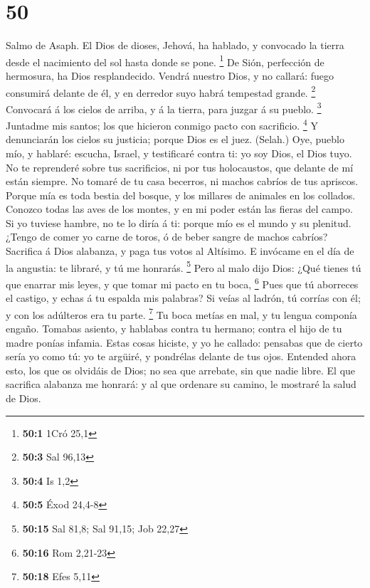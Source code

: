 \hypertarget{section-49}{%
\section{50}\label{section-49}}

 Salmo de Asaph. El Dios de dioses, Jehová, ha hablado, y
convocado la tierra desde el nacimiento del sol hasta donde se pone.
\footnote{\textbf{50:1} 1Cró 25,1}  De Sión, perfección de
hermosura, ha Dios resplandecido.  Vendrá nuestro Dios, y no
callará: fuego consumirá delante de él, y en derredor suyo habrá
tempestad grande. \footnote{\textbf{50:3} Sal 96,13} 
Convocará á los cielos de arriba, y á la tierra, para juzgar á su
pueblo. \footnote{\textbf{50:4} Is 1,2}  Juntadme mis
santos; los que hicieron conmigo pacto con sacrificio. \footnote{\textbf{50:5}
  Éxod 24,4-8}  Y denunciarán los cielos su justicia; porque
Dios es el juez. (Selah.)  Oye, pueblo mío, y hablaré:
escucha, Israel, y testificaré contra ti: yo soy Dios, el Dios tuyo.
 No te reprenderé sobre tus sacrificios, ni por tus
holocaustos, que delante de mí están siempre.  No tomaré de
tu casa becerros, ni machos cabríos de tus apriscos. 
Porque mía es toda bestia del bosque, y los millares de animales en los
collados.  Conozco todas las aves de los montes, y en mi
poder están las fieras del campo.  Si yo tuviese hambre, no
te lo diría á ti: porque mío es el mundo y su plenitud. 
¿Tengo de comer yo carne de toros, ó de beber sangre de machos cabríos?
 Sacrifica á Dios alabanza, y paga tus votos al Altísimo.
 E invócame en el día de la angustia: te libraré, y tú me
honrarás. \footnote{\textbf{50:15} Sal 81,8; Sal 91,15; Job 22,27}
 Pero al malo dijo Dios: ¿Qué tienes tú que enarrar mis
leyes, y que tomar mi pacto en tu boca, \footnote{\textbf{50:16} Rom
  2,21-23}  Pues que tú aborreces el castigo, y echas á tu
espalda mis palabras?  Si veías al ladrón, tú corrías con
él; y con los adúlteros era tu parte. \footnote{\textbf{50:18} Efes 5,11}
 Tu boca metías en mal, y tu lengua componía engaño.
 Tomabas asiento, y hablabas contra tu hermano; contra el
hijo de tu madre ponías infamia.  Estas cosas hiciste, y yo
he callado: pensabas que de cierto sería yo como tú: yo te argüiré, y
pondrélas delante de tus ojos.  Entended ahora esto, los
que os olvidáis de Dios; no sea que arrebate, sin que nadie libre.
 El que sacrifica alabanza me honrará: y al que ordenare su
camino, le mostraré la salud de Dios.

